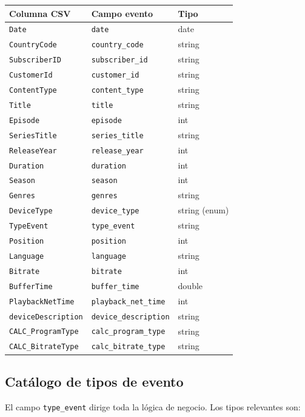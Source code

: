 \documentclass[12pt, letterpaper]{article}
\newcommand{\code}[1]{\texttt{#1}}
\begin{document}
\begin{center}
\begin{longtable}{@{}lll@{}}
\toprule
\textbf{Columna CSV} & \textbf{Campo evento} & \textbf{Tipo} \\
\midrule
\endhead
\code{Date} & \code{date} & date \\
\code{CountryCode} & \code{country\_code} & string \\
\code{SubscriberID} & \code{subscriber\_id} & string \\
\code{CustomerId} & \code{customer\_id} & string \\
\code{ContentType} & \code{content\_type} & string \\
\code{Title} & \code{title} & string \\
\code{Episode} & \code{episode} & int \\
\code{SeriesTitle} & \code{series\_title} & string \\
\code{ReleaseYear} & \code{release\_year} & int \\
\code{Duration} & \code{duration} & int \\
\code{Season} & \code{season} & int \\
\code{Genres} & \code{genres} & string \\
\code{DeviceType} & \code{device\_type} & string (enum) \\
\code{TypeEvent} & \code{type\_event} & string \\
\code{Position} & \code{position} & int \\
\code{Language} & \code{language} & string \\
\code{Bitrate} & \code{bitrate} & int \\
\code{BufferTime} & \code{buffer\_time} & double \\
\code{PlaybackNetTime} & \code{playback\_net\_time} & int \\
\code{deviceDescription} & \code{device\_description} & string \\
\code{CALC\_ProgramType} & \code{calc\_program\_type} & string \\
\code{CALC\_BitrateType} & \code{calc\_bitrate\_type} & string \\
\bottomrule
\end{longtable}
\end{center}

\subsection{Catálogo de tipos de evento}
El campo \code{type\_event} dirige toda la lógica de negocio. Los tipos
relevantes son:
\end{document}
